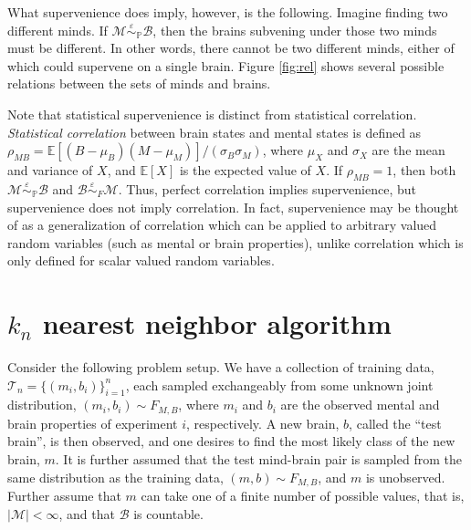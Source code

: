 \documentclass{article}
\newcommand{\mB}{\mathcal{B}}
\newcommand{\mM}{\mathcal{M}}
\newcommand{\PP}{\mathbb{P}}           %
\newcommand{\EE}{\mathbb{E}}           %
\newcommand{\sig}{\sigma}
\providecommand{\mc}[1]{\mathcal{#1}}
\newcommand{\MeB}{\mM \overset{\varepsilon}{{\sim}}_{\PP} \mB}
\begin{document}
What supervenience does imply, however, is the following.   Imagine finding two different minds.  If $\MeB$, then the brains subvening under those two minds must be different.  In other words, there cannot be two different minds, either of which could supervene on a single brain.  Figure \ref{fig:rel} shows several possible relations between the sets of minds and brains.


Note that statistical supervenience is distinct from statistical correlation.  \emph{Statistical correlation} between brain states and mental states is defined as $\rho_{MB}=\EE[(B-\mu_B)(M-\mu_M)]/(\sig_B \sig_M)$, where $\mu_X$ and $\sig_X$ are the mean and variance of $X$, and $\EE[X]$ is the expected value of $X$.  If $\rho_{MB}=1$, then both $\MeB$ and $\mB \overset{\varepsilon}{{\sim}}_{F} \mM$. Thus, perfect correlation implies supervenience, but supervenience does not imply correlation.  In fact, supervenience may be thought of as a generalization of correlation which can be applied to arbitrary valued random variables (such as mental or brain properties), unlike correlation which is only defined for scalar valued random variables.



\section{$k_n$ nearest neighbor algorithm} %
\label{sec:knn}

Consider the following problem setup.  We have a collection of training data, $\mc{T}_n =\{(m_i,b_i)\}_{i=1}^n$, each sampled exchangeably from some unknown joint distribution, $(m_i,b_i)\sim F_{M,B}$, where $m_i$ and $b_i$ are the observed mental and brain properties of experiment $i$, respectively.  A new brain, $b$, called the ``test brain'', is then observed, and one desires to find the most likely class of the new brain, $m$.  It is further assumed that the test mind-brain pair is sampled from the same distribution as the training data, $(m,b)\sim F_{M,B}$, and $m$ is unobserved. Further assume that $m$ can take one of a finite number of possible values, that is, $|\mc{M}|<\infty$, and that  $\mc{B}$ is countable.
\end{document}
